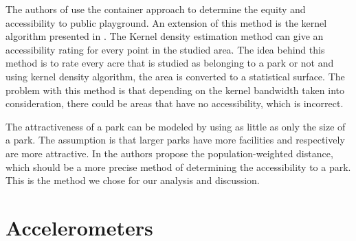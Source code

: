 The authors of \cite{talen1998assessing} use the container approach to determine the equity and accessibility to public playground. An extension of this method is the kernel algorithm presented in \cite{maroko2009complexities}. The Kernel density estimation method can give an accessibility rating for every point in the studied area. The idea behind this method is to rate every acre that is studied as belonging to a park or not and using kernel density algorithm, the area is converted to a statistical surface. The problem with this method is that depending on the kernel bandwidth taken into consideration, there could be areas that have no accessibility, which is incorrect.

The attractiveness of a park can be modeled by using as little as only the size of a park. The assumption is that larger parks have more facilities and respectively are more attractive. In \cite{zhang2011modeling} the authors propose the population-weighted distance, which should be a more precise method of determining the accessibility to a park. This is the method we chose for our analysis and discussion.

\section{Accelerometers}
\label{sec:related-acc}
